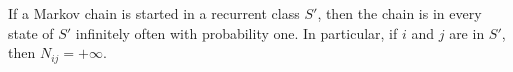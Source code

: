 If a Markov chain is started in a recurrent class $S'$, then the chain is in every state of $S'$ infinitely often with probability one. In particular, if $i$ and $j$ are in $S'$, then $N_{ij} = +\infty$.
